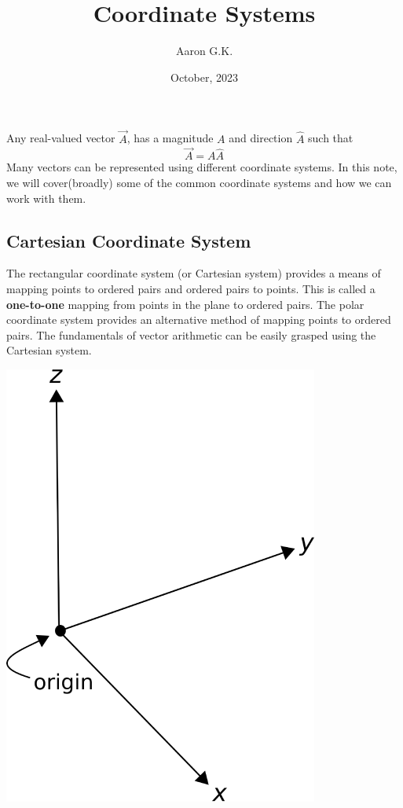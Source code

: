 \documentclass[12pt,addpoints]{exam}
\date{October, 2023}
\title{Coordinate Systems}
\author{Aaron G.K.}
\begin{document}
	\maketitle
	Any real-valued vector $\vec{A}$, has a magnitude $A$ and direction $\hat{A}$ such that
	$$\vec{A}=A\hat{A}$$
	Many vectors can be represented using different coordinate systems. In this note, we will cover(broadly) some of the common coordinate systems and how we can work with them.
	\subsection*{Cartesian Coordinate System}
	The rectangular coordinate system (or Cartesian system) provides a means of mapping points to ordered pairs and ordered pairs to points. This is called a \textbf{one-to-one} mapping from points in the plane to ordered pairs. The polar coordinate system provides an alternative method of mapping points to ordered pairs. The fundamentals of vector arithmetic can be easily grasped using the Cartesian system.
	\begin{center}
		\includegraphics[scale=1.0]{cartesian.png}
	\end{center}
\end{document}
